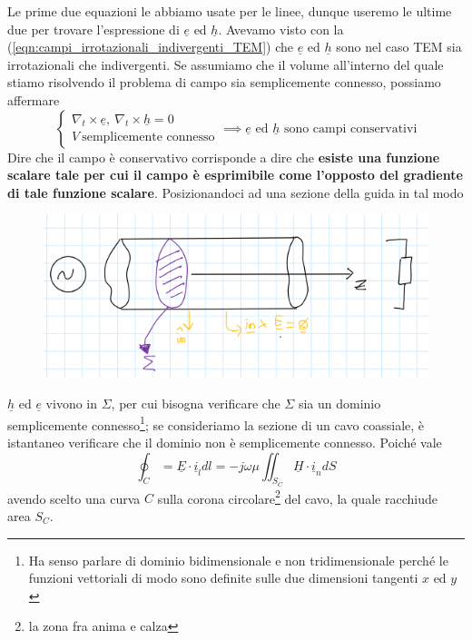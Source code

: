 \documentclass{book}
\begin{document}
        Le prime due equazioni le abbiamo usate per le linee, dunque useremo le ultime due per trovare l'espressione di $\underline{e}$ ed $\underline{h}$. Avevamo visto con la (\ref{eqn:campi_irrotazionali_indivergenti_TEM}) che
        $\underline{e}$ ed $\underline{h}$ sono nel caso TEM sia irrotazionali che indivergenti. Se assumiamo che il volume all'interno del quale stiamo risolvendo il problema di campo sia semplicemente connesso, possiamo affermare 
        \begin{equation}
            \begin{cases}
                \nabla_{t} \times \underline{e}, \ \nabla_{t} \times \underline{h} = 0 \\
                V \ \textrm{semplicemente connesso}
            \end{cases} 
            \implies
            \underline{e} \textrm{ ed } \underline{h} \textrm{ sono campi conservativi} 
        \end{equation}
        Dire che il campo è conservativo corrisponde a dire che \textbf{esiste una funzione scalare tale per cui il campo è esprimibile come l'opposto del gradiente di tale funzione scalare}. \newpage 
        Posizionandoci ad una sezione della guida in tal modo
        \begin{figure}[h!]
            \center  
            \includegraphics[width=0.6\linewidth]{img/Chapter_three/Chapt3img4.png}
        \end{figure}
        $\underline{h}$ ed $\underline{e}$ vivono in $\Sigma$, per cui bisogna verificare che $\Sigma$ sia un dominio semplicemente connesso\footnote{Ha senso parlare di dominio bidimensionale e non tridimensionale perché le funzioni vettoriali di modo
        sono definite sulle due dimensioni tangenti $x$ ed $y$}; se consideriamo la sezione di un cavo coassiale, è istantaneo verificare che il dominio non è semplicemente connesso. Poiché vale
        \begin{equation}
            \oint_{C} = \underline{E} \cdot \underline{i}_{l}dl = - j \omega \mu \iint_{S_{C}} \underline{H} \cdot \underline{i}_{n} dS
        \end{equation}
        avendo scelto una curva $C$ sulla corona circolare\footnote{la zona fra anima e calza} del cavo, la quale racchiude area $S_{C}$.
\end{document}
